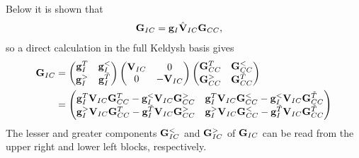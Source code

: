 Below it is shown that
\begin{alignat}{2}
 \mathbf{G}_{IC} &= \mathbf{g}_I\hat{\mathbf{V}}_{IC} \mathbf{G}_{CC} ,
\end{alignat}
so a direct calculation in the full Keldysh basis gives
\begin{alignat}{2}
  \mathbf{G}_{IC} &= \left( \begin{matrix}
          \mathbf{g}_I^{T} & \mathbf{g}_I^< \\
	  \mathbf{g}_I^> & \mathbf{g}_I^{\tilde{T}}
            \end{matrix}
 \right) 
\left( \begin{matrix}
           \mathbf{V}_{IC} & 0 \\
	  0 & -\mathbf{V}_{IC}
            \end{matrix}
 \right)
\left( \begin{matrix}
          \mathbf{G}_{CC}^{T} & \mathbf{G}_{CC}^< \\
	  \mathbf{G}_{CC}^> & \mathbf{G}_{CC}^{\tilde{T}}
            \end{matrix}
 \right)
\\
  &= \left(\begin{matrix}
      \mathbf{g}_I^T \mathbf{V}_{IC} \mathbf{G}_{CC}^T-\mathbf{g}_I^< \mathbf{V}_{IC} \mathbf{G}_{CC}^> &	\mathbf{g}_I^T \mathbf{V}_{IC} \mathbf{G}_{CC}^< - \mathbf{g}_I^< \mathbf{V}_{IC} \mathbf{G}_{CC}^{\tilde{T}} \\
     \mathbf{g}_I^> \mathbf{V}_{IC} \mathbf{G}_{CC}^T-\mathbf{g}_I^{\tilde{T}} \mathbf{V}_{IC} \mathbf{G}_{CC}^> &	\mathbf{g}_I^> \mathbf{V}_{IC} \mathbf{G}_{CC}^< - \mathbf{g}_I^{\tilde{T}} \mathbf{V}_{IC} \mathbf{G}_{CC}^{\tilde{T}}
     \end{matrix}
 \right)
\end{alignat}
The lesser and greater components $\mathbf{G}^<_{IC}$ and $\mathbf{G}^>_{IC}$ of $\mathbf{G}_{IC}$ can be read from the upper right and lower left blocks, respectively. 

